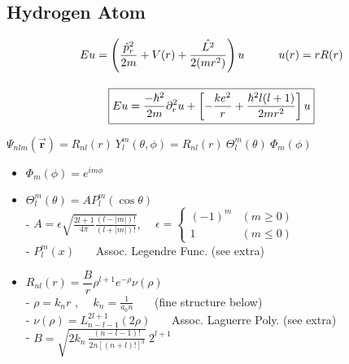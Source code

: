 \documentclass[12pt]{article}
\begin{document}
\newpage
\subsection{Hydrogen Atom}
\unskip
\begin{gather*}
    E u = \left( \frac{\hat{p}_r^2}{2m} + V(r) + \frac{\hat{L^2}}{2(mr^2)} \right) u
        \indent \indent u(r) = r R(r) \\[10pt]
    \boxed{ E u = \frac{-\hbar^2}{2m} \partial_r^2 u
        + \left[ - \frac{ke^2}{r} + \frac{\hbar^2 l(l+1)}{2m r^2} \right] u }
\end{gather*}

\vspace{10pt} \noindent
\( \boxed{ \Psi_{nlm}(\vec{\mathbf{r}}) = R_{nl}(r) \ Y^m_l(\theta, \phi) 
    = R_{nl}(r) \ \Theta^m_l(\theta) \ \Phi_m(\phi) } \)\\
\begin{minipage}[t]{.47\textwidth}
    \begin{itemize}
        \item \( \Phi_m(\phi) = e^{i m \phi}\)
        \item \( \Theta^m_l(\theta) = A P^m_l(\cos{\theta}) \)\\[5pt]
        - \( A = \epsilon \sqrt{ \frac{2l+1}{4\pi} \frac{(l-|m|)!}{(l+|m|)!} } \), \ \
            \( \epsilon = \begin{cases}
                \scriptstyle (-1)^m & \scriptstyle (m \geq 0) \\
                \scriptstyle1       & \scriptstyle (m \leq 0)
            \end{cases} \)\\[5pt]
        - \( P^m_l(x) \) \ \ \ {\scriptsize{Assoc. Legendre Func. (see extra)}}
    \end{itemize}   
\end{minipage}
\begin{minipage}[t]{.55\textwidth}
    \begin{itemize}
        \item \( R_{nl}(r) = \dfrac{B}{r} \rho^{l+1} e^{-\rho} \nu(\rho) \)\\[5pt]
        - \( \rho = k_n r \) , \ \ \( k_n = \frac{1}{a_0 n} \) 
            \ \ \ {\scriptsize(fine structure below)} \\[10pt]
        - \( \nu(\rho) = L^{2l+1}_{n-l-1}(2\rho) \) 
            \ \ \ {\scriptsize{Assoc. Laguerre Poly. (see extra)}} \\[10pt]
        - \( B = \sqrt{2 k_n \ \frac{ ( n-l-1 )! }{ 2n [ (n+l)! ]^3 }} \ 2^{l+1} \) 
    \end{itemize}     
\end{minipage}
\end{document}
